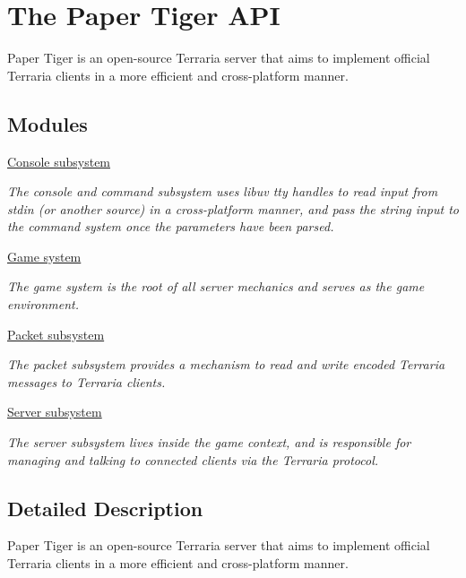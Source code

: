 \hypertarget{group__paper-tiger}{}\section{The Paper Tiger A\+P\+I}
\label{group__paper-tiger}


Paper Tiger is an open-\/source Terraria server that aims to implement official Terraria clients in a more efficient and cross-\/platform manner.  


\subsection*{Modules}
\begin{DoxyCompactItemize}
\item 
\hyperlink{group__console}{Console subsystem}
\begin{DoxyCompactList}\small\item\em The console and command subsystem uses libuv tty handles to read input from stdin (or another source) in a cross-\/platform manner, and pass the string input to the command system once the parameters have been parsed. \end{DoxyCompactList}\item 
\hyperlink{group__game}{Game system}
\begin{DoxyCompactList}\small\item\em The game system is the root of all server mechanics and serves as the game environment. \end{DoxyCompactList}\item 
\hyperlink{group__packet}{Packet subsystem}
\begin{DoxyCompactList}\small\item\em The packet subsystem provides a mechanism to read and write encoded Terraria messages to Terraria clients. \end{DoxyCompactList}\item 
\hyperlink{group__server}{Server subsystem}
\begin{DoxyCompactList}\small\item\em The server subsystem lives inside the {\ttfamily game} context, and is responsible for managing and talking to connected clients via the {\itshape Terraria} protocol. \end{DoxyCompactList}\end{DoxyCompactItemize}


\subsection{Detailed Description}
Paper Tiger is an open-\/source Terraria server that aims to implement official Terraria clients in a more efficient and cross-\/platform manner. 

